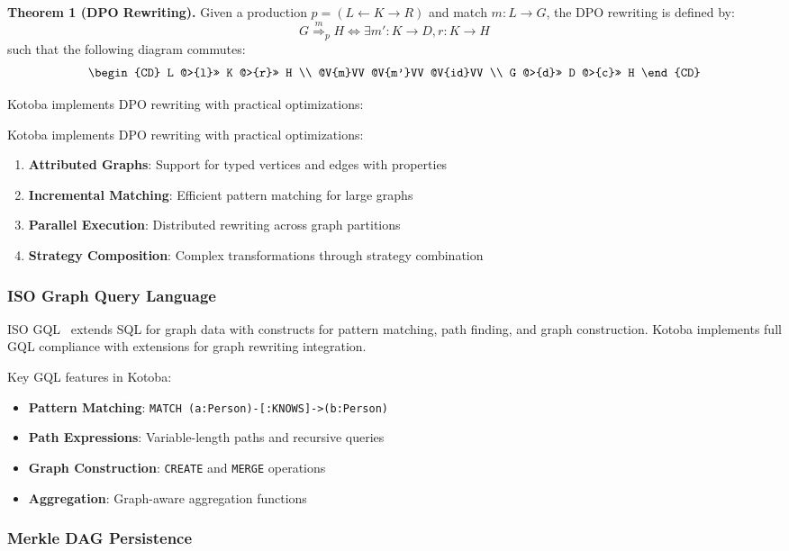 \documentclass[11pt,a4paper]{article}
\begin{document}
\textbf{Theorem 1 (DPO Rewriting).} Given a production $p = (L \leftarrow K \rightarrow R)$ and match $m: L \rightarrow G$, the DPO rewriting is defined by:
\[
G \overset{m}{\Rightarrow}_{p} H \iff \exists m': K \rightarrow D, r: K \rightarrow H
\]
such that the following diagram commutes:
\[
\begin{CD}
L @>{l}>> K @>{r}>> H \\
@V{m}VV @V{m'}VV @V{id}VV \\
G @>{d}>> D @>{c}>> H
\end{CD}
\]

Kotoba implements DPO rewriting with practical optimizations:

Kotoba implements DPO rewriting with practical optimizations:
\begin{enumerate}
\item \textbf{Attributed Graphs}: Support for typed vertices and edges with properties
\item \textbf{Incremental Matching}: Efficient pattern matching for large graphs
\item \textbf{Parallel Execution}: Distributed rewriting across graph partitions
\item \textbf{Strategy Composition}: Complex transformations through strategy combination
\end{enumerate}

\subsubsection{ISO Graph Query Language}
\label{subsubsec:gql}

ISO GQL~\cite{iso_gql} extends SQL for graph data with constructs for pattern matching, path finding, and graph construction. Kotoba implements full GQL compliance with extensions for graph rewriting integration.

Key GQL features in Kotoba:
\begin{itemize}
\item \textbf{Pattern Matching}: \verb|MATCH (a:Person)-[:KNOWS]->(b:Person)|
\item \textbf{Path Expressions}: Variable-length paths and recursive queries
\item \textbf{Graph Construction}: \verb|CREATE| and \verb|MERGE| operations
\item \textbf{Aggregation}: Graph-aware aggregation functions
\end{itemize}

\subsubsection{Merkle DAG Persistence}
\label{subsubsec:merkle}
\end{document}
